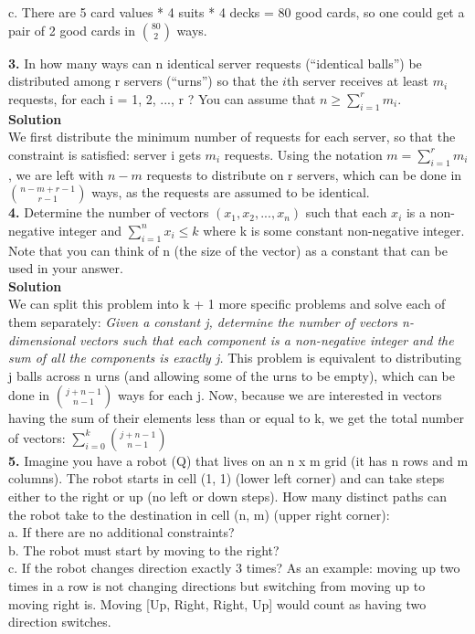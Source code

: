 \documentclass[12pt,a4paper,oneside,draft]{report}
\begin{document}
c. There are 5 card values * 4 suits * 4 decks = 80 good cards, so one could get a pair of 2 good cards in ${80 \choose 2}$ ways.

\textbf{3. }In how many ways can n identical server requests (“identical balls”) be distributed among r servers (“urns”) so that the $i$th server receives at least $m_i$ requests, for each i = 1, 2, ..., r ?
You can assume that $n \geq \sum_{i=1}^{r}m_i$. \\

\textbf{Solution}\\

We first distribute the minimum number of requests for each server, so that the constraint is satisfied: server i gets $m_i$ requests. Using the notation $m = \sum_{i=1}^{r}m_i$, we are left with $n - m$ requests to distribute on r servers, which can be done in 
$n - m + r - 1 \choose r - 1$ ways, as the requests are assumed to be identical. \\

\textbf{4.} Determine the number of vectors $(x_1 , x_2 , ..., x_n)$ such that each $x_i$ is a non-negative integer and $\sum_{i=1}^{n}x_i \leq k$ where k is some constant non-negative integer. Note that you can think of n (the size of the vector) as a constant that can be used in your answer. \\

\textbf{Solution} \\ 

We can split this problem into k + 1 more specific problems and solve each of them separately: \textit{Given a constant j, determine the number of vectors n-dimensional vectors such that each component is a non-negative integer and the sum of all the components is exactly j.} This problem is equivalent to distributing j balls across n urns (and allowing some of the urns to be empty), which can be done in $j + n - 1 \choose n - 1$ ways for each j. Now, because we are interested in vectors having the sum of their elements less than or equal to k, we get the total number of vectors: $\sum_{i=0}^{k} {j + n - 1 \choose n - 1}$ \\

\textbf{5.} Imagine you have a robot (Q) that lives on an n x m grid (it has n rows and m columns). The robot starts in cell (1, 1) (lower left corner) and can take steps either to the right or up (no left or down steps). How many distinct paths can the robot take to the destination in cell (n, m) (upper right corner): \\
a. If there are no additional constraints? \\
b. The robot must start by moving to the right? \\
c. If the robot changes direction exactly 3 times? As an example: moving up two times in a row is not changing directions but switching from moving up to moving right is. Moving [Up, Right, Right, Up] would count as having two direction switches. \\
\end{document}
